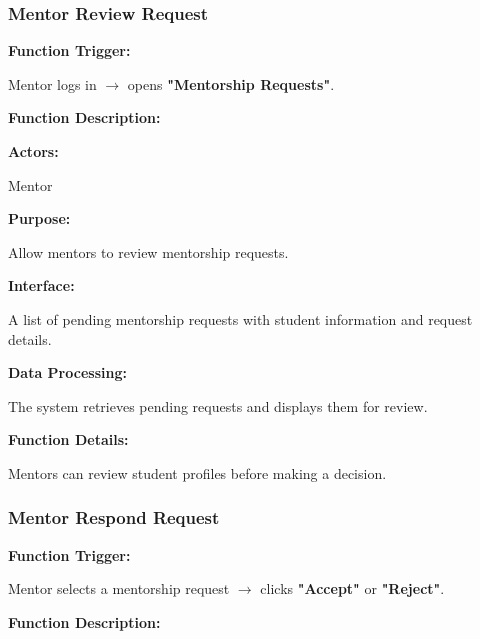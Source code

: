 \subsubsection{Mentor Review Request}

\textbf{Function Trigger:}

Mentor logs in $\rightarrow$ opens \textbf{"Mentorship Requests"}.

\vspace{0.3cm}

\textbf{Function Description:}

\textbf{Actors:}

Mentor

\vspace{0.2cm}

\textbf{Purpose:}

Allow mentors to review mentorship requests.

\vspace{0.2cm}

\textbf{Interface:}

A list of pending mentorship requests with student information and request details.

\vspace{0.2cm}

\textbf{Data Processing:}

The system retrieves pending requests and displays them for review.

\vspace{0.3cm}

\textbf{Function Details:}

Mentors can review student profiles before making a decision.



\subsubsection{Mentor Respond Request}

\textbf{Function Trigger:}

Mentor selects a mentorship request $\rightarrow$ clicks \textbf{"Accept"} or \textbf{"Reject"}.

\vspace{0.3cm}

\textbf{Function Description:}

